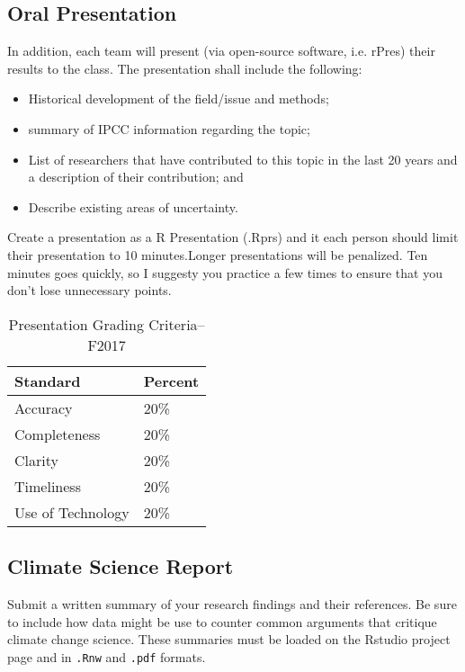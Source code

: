 \documentclass{article}\usepackage[]{graphicx}\usepackage[]{color}
\begin{document}
\subsection{Oral Presentation}

In addition, each team will present (via open-source software, i.e. rPres) their results to the class. The presentation shall include the following:

\begin{itemize}
  \item Historical development of the field/issue and methods;
  \item summary of IPCC information regarding the topic;
  \item List of researchers that have contributed to this topic in the last 20 years and a description of their contribution; and
  \item Describe existing areas of uncertainty.
\end{itemize}

Create a presentation as a R Presentation (.Rprs) and it each person should limit their presentation to 10 minutes.Longer presentations will be penalized. Ten minutes goes quickly, so I suggesty you practice a few times to ensure that you don't lose unnecessary points. 

\begin{table}[h]
\centering
\caption{Presentation Grading Criteria--F2017}
\label{tab:presentationgrading}
\begin{tabular}{ll}\hline
Standard            & Percent \\ \hline\hline    
Accuracy            & 20\%  \\
Completeness        & 20\% \\
Clarity             & 20\% \\
Timeliness          & 20\% \\
Use of Technology   & 20\% \\ \hline
\end{tabular}
\end{table}

\subsection{Climate Science Report}

Submit a written summary of your research findings and their references. Be sure to include how data might be use to counter common arguments that critique climate change science. These summaries must be loaded on the Rstudio project page and in \texttt{.Rnw} and \texttt{.pdf} formats. 
\end{document}
